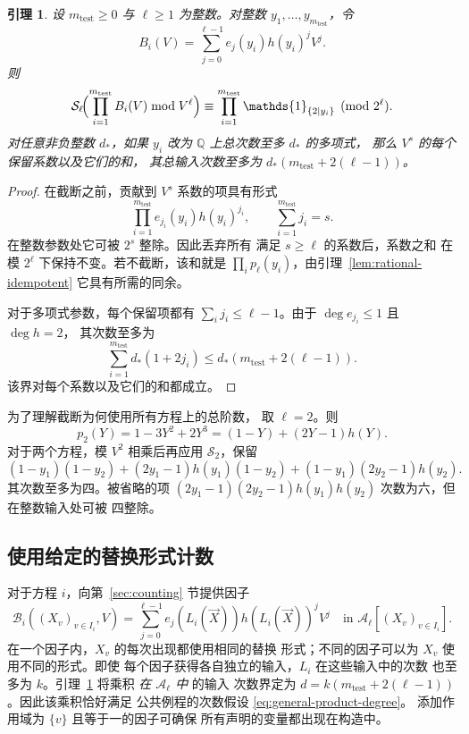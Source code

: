 \documentclass[11pt,reqno]{amsart}
\numberwithin{equation}{section}
\newtheorem{lemma}[theorem]{引理}
\theoremstyle{definition}\newtheorem{definition}[theorem]{定义}
\theoremstyle{remark}\newtheorem{remark}[theorem]{注}
\renewcommand{\le}{\leqslant}
\renewcommand{\ge}{\geqslant}
\begin{document}
\begin{lemma}\label{lem:total-order}
设 $m_{\mathrm{test}}\ge0$ 与 $\ell\ge1$ 为整数。对整数
$y_1,\ldots,y_{m_{\mathrm{test}}}$，令
\[
 B_i(V)=\sum_{j=0}^{\ell-1}e_j(y_i)h(y_i)^jV^j.
\]
则
\[
 \mathcal S_\ell\!\Bigl(\prod_{i=1}^{m_{\mathrm{test}}} B_i(V)\bmod V^\ell\Bigr)
 \equiv\prod_{i=1}^{m_{\mathrm{test}}}\mathds{1}_{\{2\mid y_i\}}\pmod{2^\ell}.
\]
对任意非负整数 $d_*$，如果 $y_i$ 改为
$\mathbb Q$ 上总次数至多 $d_*$ 的多项式，
那么 $V^s$ 的每个保留系数以及它们的和，
其总输入次数至多为
$d_*(m_{\mathrm{test}}+2(\ell-1))$。
\end{lemma}
\begin{proof}
在截断之前，贡献到 $V^s$ 系数的项具有形式
\[
 \prod_{i=1}^{m_{\mathrm{test}}} e_{j_i}(y_i)h(y_i)^{j_i},
 \qquad \sum_{i=1}^{m_{\mathrm{test}}} j_i=s.
\]
在整数参数处它可被 $2^s$ 整除。因此丢弃所有
满足 $s\ge\ell$ 的系数后，系数之和
在模 $2^\ell$ 下保持不变。若不截断，该和就是
$\prod_i p_\ell(y_i)$，由引理~\ref{lem:rational-idempotent}
它具有所需的同余。

对于多项式参数，每个保留项都有
$\sum_i j_i\le\ell-1$。由于 $\deg e_{j_i}\le1$ 且 $\deg h=2$，
其次数至多为
\[
 \sum_{i=1}^{m_{\mathrm{test}}} d_*(1+2j_i)
 \le d_*(m_{\mathrm{test}}+2(\ell-1)).
\]
该界对每个系数以及它们的和都成立。
\end{proof}

为了理解截断为何使用所有方程上的总阶数，
取 $\ell=2$。则
\[
 p_2(Y)=1-3Y^2+2Y^3=(1-Y)+(2Y-1)h(Y).
\]
对于两个方程，模 $V^2$ 相乘后再应用
$\mathcal S_2$，保留
\[
 (1-y_1)(1-y_2)
 +(2y_1-1)h(y_1)(1-y_2)
 +(1-y_1)(2y_2-1)h(y_2).
\]
其次数至多为四。被省略的项
$(2y_1-1)(2y_2-1)h(y_1)h(y_2)$ 次数为六，但在整数输入处可被
四整除。

\subsection{使用给定的替换形式计数}\label{subsec:count-polynomial}
对于方程 $i$，向第~\ref{sec:counting} 节提供因子
\begin{equation}\label{eq:lifted-factor}
 \mathcal B_i((X_v)_{v\in I_i},V)
 =\sum_{j=0}^{\ell-1}e_j(L_i(\vec X))h(L_i(\vec X))^j V^j
 \quad\text{in }\mathcal A_\ell[(X_v)_{v\in I_i}].
\end{equation}
在一个因子内，$X_v$ 的每次出现都使用相同的替换
形式；不同的因子可以为 $X_v$ 使用不同的形式。即使
每个因子获得各自独立的输入，$L_i$ 在这些输入中的次数
也至多为 $k$。引理~\ref{lem:total-order} 将乘积 \emph{在 $\mathcal A_\ell$ 中} 的输入
次数界定为
$d=k(m_{\mathrm{test}}+2(\ell-1))$。因此该乘积恰好满足
公共例程的次数假设 \eqref{eq:general-product-degree}。
添加作用域为 $\{v\}$ 且等于一的因子可确保
所有声明的变量都出现在构造中。
\end{document}

